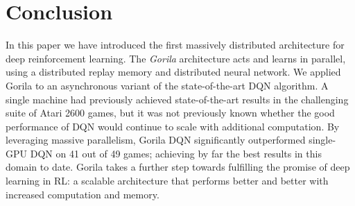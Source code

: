 \section{Conclusion}
In this paper we have introduced the first massively distributed architecture for deep reinforcement learning. The \emph{Gorila} architecture acts and learns in parallel, using a distributed replay memory and distributed neural network. We applied Gorila to  an asynchronous variant of the state-of-the-art DQN algorithm. A single machine had previously achieved state-of-the-art results in the challenging suite of Atari 2600 games, but it was not previously known whether the good performance of DQN would continue to scale with additional computation. By leveraging massive parallelism, Gorila DQN significantly outperformed single-GPU DQN on 41 out of 49 games; achieving by far the best results in this domain to date. Gorila takes a further step towards fulfilling the promise of deep learning in RL: a scalable architecture that performs better and better with increased computation and memory.
